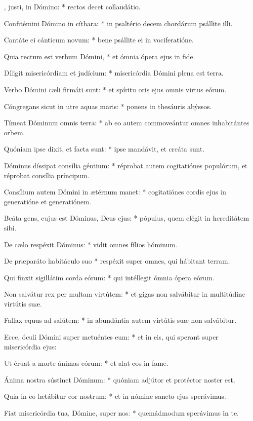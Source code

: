 \begin{psalmus}

    , justi, in Dómino: * rectos decet collaudátio.

    Confitémini Dómino in cíthara: * in psaltério decem chordárum psállite illi.

    Cantáte ei cánticum novum: * bene psállite ei in vociferatióne.

    Quia rectum est verbum Dómini, * et ómnia ópera ejus in fide.

    Díligit misericórdiam et judícium: * misericórdia Dómini plena est terra.

    Verbo Dómini cæli firmáti sunt: * et spíritu oris ejus omnis virtus eórum.

    Cóngregans sicut in utre aquas maris: * ponens in thesáuris abýssos.

    Tímeat Dóminum omnis terra: * ab eo autem commoveántur omnes inhabitántes orbem.

    Quóniam ipse dixit, et facta sunt: * ipse mandávit, et creáta sunt.

    Dóminus díssipat consília géntium: * réprobat autem cogitatiónes populórum, et réprobat consília príncipum.

    Consílium autem Dómini in ætérnum manet: * cogitatiónes cordis ejus in generatióne et generatiónem.

    Beáta gens, cujus est Dóminus, Deus ejus: * pópulus, quem elégit in hereditátem sibi.

    De cælo respéxit Dóminus: * vidit omnes fílios hóminum.

    De præparáto habitáculo suo * respéxit super omnes, qui hábitant terram.

    Qui finxit sigillátim corda eórum: * qui intéllegit ómnia ópera eórum.

    Non salvátur rex per multam virtútem: * et gigas non salvábitur in multitúdine virtútis suæ.

    Fallax equus ad salútem: * in abundántia autem virtútis suæ non salvábitur.

    Ecce, óculi Dómini super metuéntes eum: * et in eis, qui sperant super misericórdia ejus:

    Ut éruat a morte ánimas eórum: * et alat eos in fame.

    Ánima nostra sústinet Dóminum: * quóniam adjútor et protéctor noster est.

    Quia in eo lætábitur cor nostrum: * et in nómine sancto ejus sperávimus.

    Fiat misericórdia tua, Dómine, super nos: * quemádmodum sperávimus in te.

\end{psalmus}
